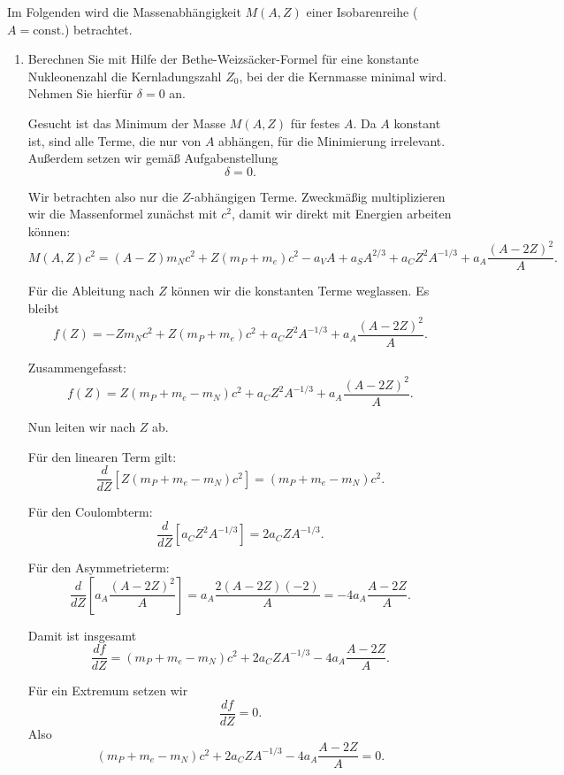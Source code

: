 \documentclass[11pt,a4paper]{scrartcl}
\begin{document}
Im Folgenden wird die Massenabhängigkeit $M(A,Z)$ einer Isobarenreihe ($A=\text{const.}$) betrachtet.

\begin{enumerate}[label=(\alph*)]

    \item Berechnen Sie mit Hilfe der Bethe-Weizsäcker-Formel für eine konstante Nukleonenzahl die Kernladungszahl $Z_0$, bei der die Kernmasse minimal wird. Nehmen Sie hierfür $\delta=0$ an.

    \begin{solutionbox}
        Gesucht ist das Minimum der Masse $M(A,Z)$ für festes $A$.
        Da $A$ konstant ist, sind alle Terme, die nur von $A$ abhängen, für die Minimierung irrelevant.
        Außerdem setzen wir gemäß Aufgabenstellung
        \[
            \delta=0.
        \]

        Wir betrachten also nur die $Z$-abhängigen Terme.
        Zweckmäßig multiplizieren wir die Massenformel zunächst mit $c^2$, damit wir direkt mit Energien arbeiten können:
        \[
            M(A,Z)c^2
            =(A-Z)m_Nc^2+Z(m_P+m_e)c^2
            -a_VA+a_SA^{2/3}+a_CZ^2A^{-1/3}+a_A\frac{(A-2Z)^2}{A}.
        \]

        Für die Ableitung nach $Z$ können wir die konstanten Terme weglassen.
        Es bleibt
        \[
            f(Z)= -Zm_Nc^2 + Z(m_P+m_e)c^2 + a_CZ^2A^{-1/3} + a_A\frac{(A-2Z)^2}{A}.
        \]

        Zusammengefasst:
        \[
            f(Z)= Z(m_P+m_e-m_N)c^2 + a_CZ^2A^{-1/3} + a_A\frac{(A-2Z)^2}{A}.
        \]

        Nun leiten wir nach $Z$ ab.

        Für den linearen Term gilt:
        \[
            \frac{d}{dZ}\left[Z(m_P+m_e-m_N)c^2\right]
            =(m_P+m_e-m_N)c^2.
        \]

        Für den Coulombterm:
        \[
            \frac{d}{dZ}\left[a_CZ^2A^{-1/3}\right]
            =2a_CZA^{-1/3}.
        \]

        Für den Asymmetrieterm:
        \[
            \frac{d}{dZ}\left[a_A\frac{(A-2Z)^2}{A}\right]
            =a_A\frac{2(A-2Z)(-2)}{A}
            =-4a_A\frac{A-2Z}{A}.
        \]

        Damit ist insgesamt
        \[
            \frac{df}{dZ}
            =(m_P+m_e-m_N)c^2 + 2a_CZA^{-1/3} -4a_A\frac{A-2Z}{A}.
        \]

        Für ein Extremum setzen wir
        \[
            \frac{df}{dZ}=0.
        \]
        Also
        \[
            (m_P+m_e-m_N)c^2 + 2a_CZA^{-1/3} -4a_A\frac{A-2Z}{A}=0.
        \]


\end{solutionbox}
\end{enumerate}
\end{document}

